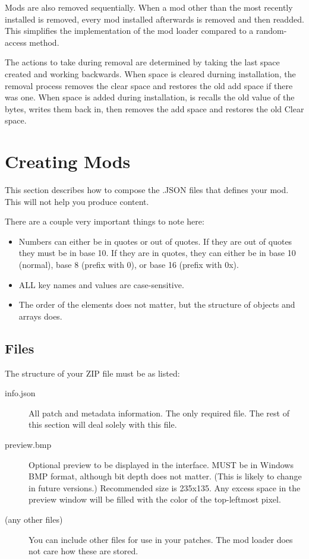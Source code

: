 \documentclass[12pt,a4paper,notitlepage]{article}
\begin{document}
Mods are also removed sequentially. When a mod other than the most recently installed is removed, every mod installed afterwards is removed and then readded. This simplifies the implementation of the mod loader compared to a random-access method. 

The actions to take during removal are determined by taking the last space created and working backwards. When space is cleared durning installation, the removal process removes the clear space and restores the old add space if there was one. When space is added during installation, is recalls the old value of the bytes, writes them back in, then removes the add space and restores the old Clear space.

\pagebreak
\section{Creating Mods}
\label{sec:create}
This section describes how to compose the .JSON files that defines your mod. This will not help you produce content.

There are a couple very important things to note here:

\begin{itemize}
	\item Numbers can either be in quotes or out of quotes. If they are out of quotes they must be in base 10. If they are in quotes, they can either be in base 10 (normal), base 8 (prefix with 0), or base 16 (prefix with 0x).
	\item ALL key names and values are case-sensitive. 
	\item The order of the elements does not matter, but the structure of objects and arrays does.
\end{itemize}

\subsection{Files}
\label{subsec:create-files}
The structure of your ZIP file must be as listed:
\begin{description}
\item[info.json] All patch and metadata information. The only required file. The rest of this section will deal solely with this file.
\item[preview.bmp] Optional preview to be displayed in the interface. MUST be in Windows BMP format, although bit depth does not matter. (This is likely to change in future versions.) Recommended size is 235x135. Any excess space in the preview window will be filled with the color of the top-leftmost pixel.
\item[(any other files)] You can include other files for use in your patches. The mod loader does not care how these are stored.
\end{description}
\end{document}
